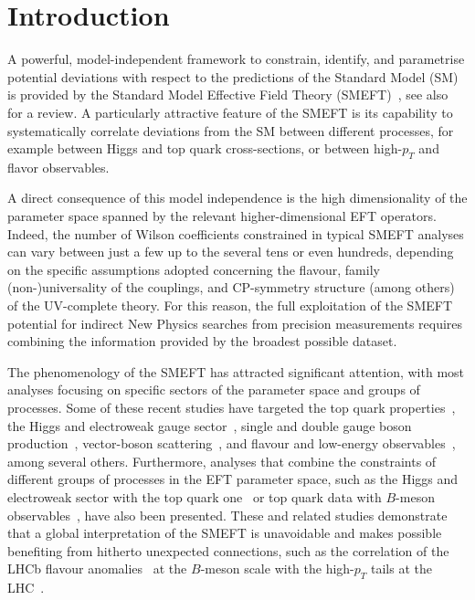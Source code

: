 \section{Introduction}

A powerful, model-independent framework to constrain, identify,  and parametrise potential
deviations with respect to the predictions of the Standard
Model (SM) is
provided by the Standard Model Effective Field
Theory (SMEFT)~\cite{Weinberg:1979sa,Buchmuller:1985jz,Grzadkowski:2010es}, see also~\cite{Brivio:2017vri}
for a review.
%
A particularly attractive feature of the SMEFT is its capability to systematically correlate
deviations from the SM between different processes, for example between  Higgs 
and top quark cross-sections, or between high-$p_T$ and flavor observables.

A direct consequence of this model independence  is the high dimensionality
of the parameter space spanned by the relevant higher-dimensional EFT operators.
%
Indeed, the number of Wilson coefficients
constrained in  typical SMEFT analyses can vary between
just a few up to the several tens or even hundreds, depending
on the specific  assumptions adopted concerning
the flavour, family (non-)universality of the couplings, and CP-symmetry
structure (among others) of the UV-complete theory.
%
For this reason, the full exploitation of the SMEFT potential
for indirect New Physics searches from precision measurements requires
combining the information provided by the broadest possible dataset.

The phenomenology of the SMEFT has attracted significant
 attention, with most analyses focusing on specific sectors
of the parameter space and groups of processes.
%
Some of these recent studies have targeted the top quark
properties~\cite{Buckley:2016cfg,Buckley:2015lku,Hartland:2019bjb,Brivio:2019ius},
the Higgs and electroweak gauge sector~\cite{Biekotter:2018rhp,Ellis:2018gqa,Almeida:2018cld},
single and double gauge boson
production~\cite{Baglio:2020ibv,Alioli:2018ljm,Ethier:2021ydt,Greljo:2017vvb},
vector-boson scattering~\cite{Gomez-Ambrosio:2018pnl,Ethier:2021ydt,Dedes:2020xmo},
and flavour and low-energy
observables~\cite{Aebischer:2018iyb,Falkowski:2019xoe,Falkowski:2017pss}, among
several others.
%
Furthermore, analyses that combine the constraints of different
groups of processes in the EFT parameter space, such as the Higgs and electroweak sector with
the top quark one~\cite{Ellis:2020unq} or 
top quark data with $B$-meson observables~\cite{Bissmann:2020mfi,Bruggisser:2021duo},
have also been presented.
%
These and related studies demonstrate that a
global interpretation of the SMEFT is unavoidable and makes possible
benefiting from hitherto unexpected connections, such as the  correlation
of the LHCb flavour anomalies~\cite{Pich:2019pzg,Aaij:2021vac}
at the $B$-meson scale with the high-$p_T$ tails
at the LHC~\cite{Greljo:2017vvb,Fuentes-Martin:2020lea}.

